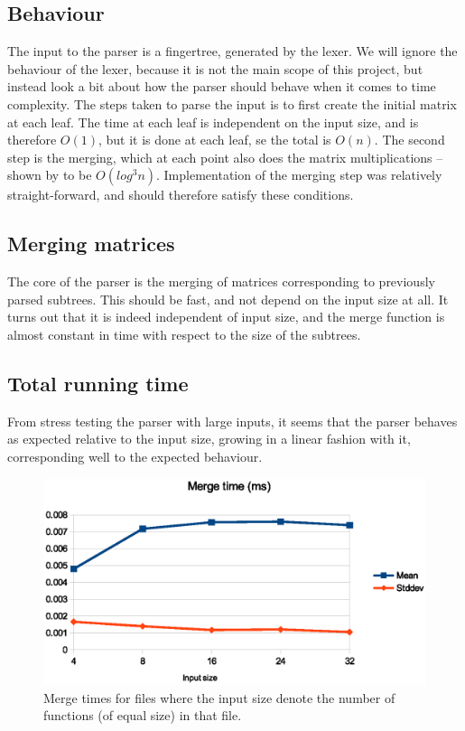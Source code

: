 \documentclass[a4paper,12pt,twosided]{report}
\begin{document}
\subsection{Behaviour}
The input to the parser is a fingertree, generated by the lexer. We will ignore
the behaviour of the lexer, because it is not the main scope of this project, but
instead look a bit about how the parser should behave when it comes to time
complexity. The steps taken to parse the input is to first create the initial
matrix at each leaf. The time at each leaf is independent on the input size, and
is therefore $O(1)$, but it is done at each leaf, se the total is $O(n)$. The
second step is the merging, which at each point also does the matrix
multiplications -- shown by \citet{parparsepaper} to be $O(log^3 n)$.
Implementation of the merging step was relatively straight-forward, and should
therefore satisfy these conditions. 

\subsection{Merging matrices}
The core of the parser is the merging of matrices corresponding to previously
parsed subtrees. This should be fast, and not depend on the input size at all.
It turns out that it is indeed independent of input size, and the merge function
is almost constant in time with respect to the size of the subtrees.

\subsection{Total running time}
From stress testing the parser with large inputs, it seems that the parser
behaves as expected relative to the input size, growing in a linear fashion with
it, corresponding well to the expected behaviour.

\begin{figure}[H]
\includegraphics[width=\textwidth]{criterion-merge.eps}
\caption{\label{critmerge}Merge times for files where the input size denote the
number of functions (of equal size) in that file.}
\end{figure}
\end{document}
